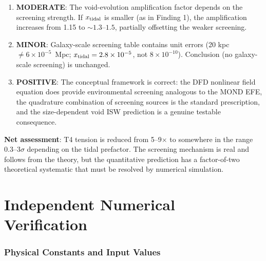 \documentclass[11pt,a4paper]{article}
\newcommand{\ee}[1]{\times 10^{#1}}
\begin{document}
\begin{tcolorbox}[colback=yellow!5!white, colframe=red!70!black,
  title=\textbf{W4i12 VALIDATION VERDICT}]
\begin{enumerate}
\item \textbf{MODERATE}: The void-evolution amplification factor
  depends on the screening strength. If $x_{\rm tidal}$ is
  smaller (as in Finding 1), the amplification increases from
  1.15 to $\sim 1.3$--$1.5$, partially offsetting the weaker
  screening.

\item \textbf{MINOR}: Galaxy-scale screening table contains unit
  errors (20 kpc $\neq 6\ee{-5}$~Mpc; $x_{\rm tidal} = 2.8\ee{-5}$,
  not $8\ee{-10}$). Conclusion (no galaxy-scale screening)
  is unchanged.

\item \textbf{POSITIVE}: The conceptual framework is correct: the DFD
  nonlinear field equation does provide environmental screening
  analogous to the MOND EFE, the quadrature combination of
  screening sources is the standard prescription, and the
  size-dependent void ISW prediction is a genuine testable
  consequence.
\end{enumerate}

\textbf{Net assessment}: T4 tension is reduced from 5--9$\times$ to
somewhere in the range 0.3--3$\sigma$ depending on the tidal
prefactor. The screening mechanism is real and follows from the
theory, but the quantitative prediction has a factor-of-two
theoretical systematic that must be resolved by numerical
simulation.

\end{tcolorbox}


\part{Independent Numerical Verification}
\label{part:numerics}


\section{Physical Constants and Input Values}
\label{sec:constants}
\end{document}
